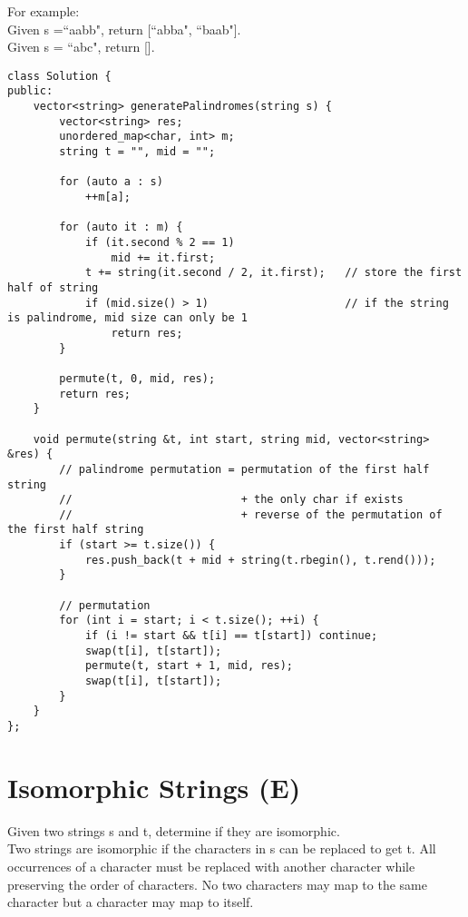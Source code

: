 For example:\\
Given s =``aabb", return [``abba", ``baab"].\\
Given s = ``abc", return [].\\

\begin{lstlisting}
class Solution {
public:
    vector<string> generatePalindromes(string s) {
        vector<string> res;
        unordered_map<char, int> m;
        string t = "", mid = "";
        
        for (auto a : s) 
            ++m[a];
        
        for (auto it : m) {
            if (it.second % 2 == 1) 
                mid += it.first;
            t += string(it.second / 2, it.first);   // store the first half of string
            if (mid.size() > 1)                     // if the string is palindrome, mid size can only be 1
                return res;
        }
        
        permute(t, 0, mid, res);
        return res;
    }
    
    void permute(string &t, int start, string mid, vector<string> &res) {
        // palindrome permutation = permutation of the first half string 
        //                          + the only char if exists
        //                          + reverse of the permutation of the first half string
        if (start >= t.size()) {
            res.push_back(t + mid + string(t.rbegin(), t.rend()));
        } 
        
        // permutation
        for (int i = start; i < t.size(); ++i) {
            if (i != start && t[i] == t[start]) continue;
            swap(t[i], t[start]);
            permute(t, start + 1, mid, res);
            swap(t[i], t[start]);
        }
    }
};
\end{lstlisting}


\section{Isomorphic Strings (E)}
Given two strings s and t, determine if they are isomorphic. \\

Two strings are isomorphic if the characters in s can be replaced to get t. All occurrences of a character must be replaced with another character while preserving the order of characters. No two characters may map to the same character but a character may map to itself.\\

